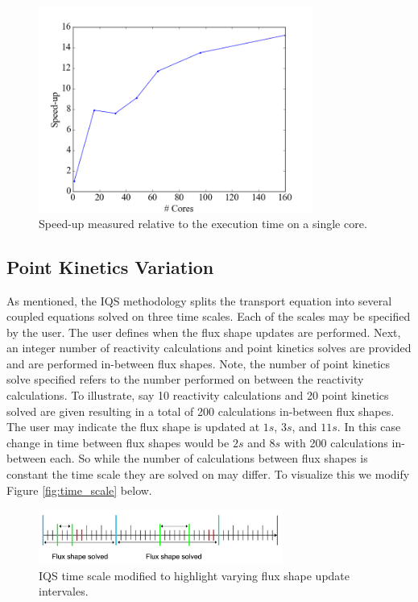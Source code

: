 \documentclass{anstrans}
\begin{document}
\begin{figure}[h]
    \centering
    \includegraphics[width=9cm]{figures/speedup.png}
    \caption{Speed-up measured relative to the execution time on a single core.}
    \label{fig:speedup}
\end{figure}


\subsection{Point Kinetics Variation}
As mentioned, the IQS methodology  splits the transport equation into several coupled equations solved on three time scales.  Each of the scales may be specified by the user.  The user defines when the flux shape updates are performed.  Next, an integer number of reactivity calculations and point kinetics solves are provided and are performed in-between flux shapes.  Note, the number of point kinetics solve specified refers to the number performed on between the reactivity calculations.  To illustrate, say 10 reactivity calculations and 20 point kinetics solved are given resulting in a total of 200 calculations in-between flux shapes.  The user may indicate the flux shape is updated at $1s$, $3s$, and $11s$.  In this case change in time between flux shapes would be $2s$ and $8s$ with 200 calculations in-between each.  So while the number of calculations between flux shapes is constant the time scale they are solved on may differ.  To visualize this we modify Figure \ref{fig:time_scale} below.

\begin{figure}[h]
    \centering
    \includegraphics[width=8cm]{figures/time_scale_mod.pdf}
    \caption{IQS time scale modified to highlight varying flux shape update intervales.}
    \label{fig:time_scale_mod}
\end{figure}
\end{document}
